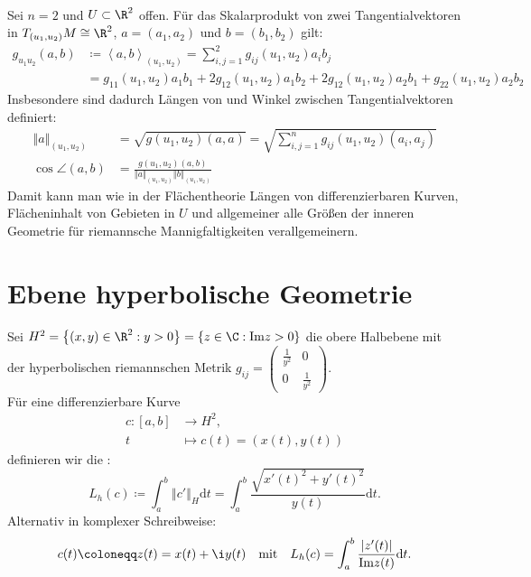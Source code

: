 \begin{remark}
  \ \\
  Sei \( n = 2 \) und \( U \subset \R^2 \) offen. Für das Skalarprodukt von zwei Tangentialvektoren in \( T_{(u_1,u_2)}M \cong \R^2 \), \( a = (a_1, a_2) \) und \( b = (b_1,b_2) \) gilt:
  \begin{align*}
    g_{u_1 u_2}(a,b) &\coloneqq \left\langle a,b \right\rangle_{(u_1, u_2)} = \sum_{i,j = 1}^2 g_{ij}(u_1,u_2)a_i b_j \\
     &= g_{11}(u_1, u_2)a_1 b_1 + 2g_{12}(u_1, u_2)a_1 b_2 + 2g_{12}(u_1, u_2)a_2b_1 + g_{22}(u_1,u_2)a_2 b_2
  \end{align*}
  Insbesondere sind dadurch Längen von und Winkel zwischen Tangentialvektoren definiert:
  \begin{align*}
    \left\Vert a \right\Vert_{(u_1, u_2)} &= \sqrt{g(u_1,u_2)(a,a)} = \sqrt{\sum_{i,j = 1}^n g_{ij}(u_1,u_2)(a_i,a_j)} \\
    \cos \angle (a,b) &= \frac{g(u_1,u_2)(a,b)}{\left\Vert a \right\Vert_{(u_1,u_2)} \left\Vert b \right\Vert_{(u_1,u_2)}}
  \end{align*}
  Damit kann man wie in der Flächentheorie Längen von differenzierbaren Kurven, Flächeninhalt von Gebieten in \( U \) und allgemeiner alle Größen der inneren Geometrie für riemannsche Mannigfaltigkeiten verallgemeinern.
\end{remark}

\section{Ebene hyperbolische Geometrie}

\begin{definition}
  Sei \( H^2 = \left \{ (x,y) \in \R^2 : y > 0 \right \} = \left \{ z \in \C : \text{Im} z > 0 \right \} \) die obere Halbebene mit der hyperbolischen riemannschen Metrik \( g_{ij} = \left( \begin{smallmatrix}
    \tfrac{1}{y^2} & 0 \\ 0 & \tfrac{1}{y^2}
  \end{smallmatrix} \right) \). \\
  Für eine differenzierbare Kurve 
  \begin{align*}
    c: [a,b] &\to H^2\text{,} \\
    t &\mapsto c(t) = (x(t),y(t))
  \end{align*}
  definieren wir die :
  \begin{equation*}
    L_h(c) \coloneqq \int_a^b \left\Vert c' \right\Vert_H \text{d}t = \int_a^b \frac{\sqrt{{x'(t)}^2 + {y'(t)}^2}}{y(t)}\text{d}t\text{.}
  \end{equation*}
  Alternativ in komplexer Schreibweise:
  \begin{equation*}
    c(t) \coloneqq z(t) = x(t) + \i y(t) \quad \text{mit} \quad L_h(c) = \int_a^b \frac{\left\vert z'(t) \right\vert}{\text{Im} z(t)}\text{d}t\text{.}
  \end{equation*}
\end{definition}

